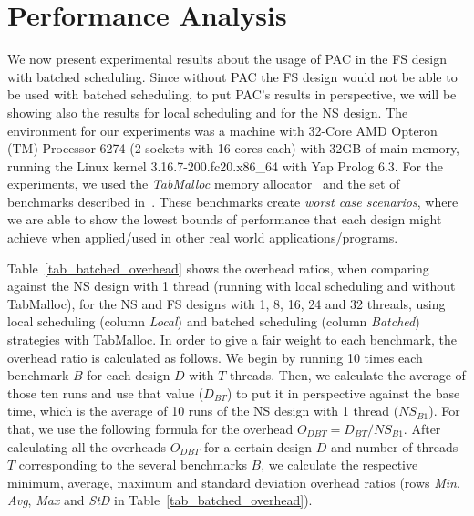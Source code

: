 \documentclass{llncs}
\begin{document}

\section{Performance Analysis}

We now present experimental results about the usage of PAC in the FS
design with batched scheduling. Since without PAC the FS design would
not be able to be used with batched scheduling, to put PAC's results
in perspective, we will be showing also the results for local
scheduling and for the NS design. The environment for our experiments
was a machine with 32-Core AMD Opteron (TM) Processor 6274 (2 sockets
with 16 cores each) with 32GB of main memory, running the Linux kernel
3.16.7-200.fc20.x86\_64 with Yap Prolog 6.3. For the experiments, we
used the \emph{TabMalloc} memory allocator~\cite{Areias-12b} and the
set of benchmarks described in~\cite{Areias-12b}. These benchmarks
create \emph{worst case scenarios}, where we are able to show the
lowest bounds of performance that each design might achieve when
applied/used in other real world applications/programs.

Table~\ref{tab_batched_overhead} shows the overhead ratios, when
comparing against the NS design with 1 thread (running with local
scheduling and without TabMalloc), for the NS and FS designs with 1,
8, 16, 24 and 32 threads, using local scheduling (column \emph{Local})
and batched scheduling (column \emph{Batched}) strategies with
TabMalloc. In order to give a fair weight to each benchmark, the
overhead ratio is calculated as follows. We begin by running 10 times
each benchmark $B$ for each design $D$ with $T$ threads. Then, we
calculate the average of those ten runs and use that value ($D_{BT}$)
to put it in perspective against the base time, which is the average
of 10 runs of the NS design with 1 thread ($NS_{B1}$). For that, we
use the following formula for the overhead $O_{DBT} = D_{BT} /
NS_{B1}$. After calculating all the overheads $O_{DBT}$ for a certain
design $D$ and number of threads $T$ corresponding to the several
benchmarks $B$, we calculate the respective minimum, average, maximum
and standard deviation overhead ratios (rows \emph{Min}, \emph{Avg},
\emph{Max} and \emph{StD} in Table~\ref{tab_batched_overhead}).
\end{document}
